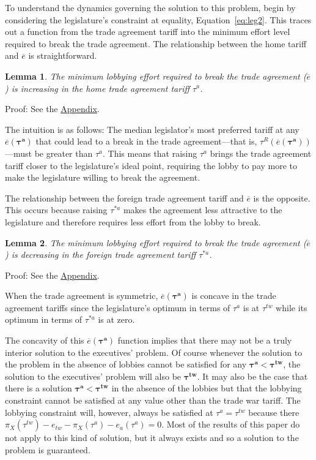 \documentclass[authoryear, review]{elsarticle}
\newtheorem{lemma}{Lemma}
\newcommand{\ov}{\overline}
\newcommand{\bta}{\bm{\tau^a}}
\newcommand{\btw}{\bm{\tau^{tw}}}
\begin{document}
To understand the dynamics governing the solution to this problem, begin by considering the legislature's constraint at equality, Equation~\ref{eq:leg2}. This traces out a function from the trade agreement tariff into the minimum effort level required to break the trade agreement. The relationship between the home tariff and $\ov{e}$ is straightforward. 
\begin{lemma}
  The minimum lobbying effort required to break the trade agreement ($\ov{e}$) is increasing in the home trade agreement tariff $\tau^a$.
  \label{lem:et}
\end{lemma}
Proof: See the \hyperlink{Cor_et}{Appendix}.

\noindent The intuition is as follows: The median legislator's most preferred tariff at any $\ov{e}(\bta)$ that could lead to a break in the trade agreement---that is, $\tau^R\left(\ov{e}(\bta)\right)$---must be greater than $\tau^a$. This means that raising $\tau^a$ brings the trade agreement tariff closer to the legislature's ideal point, requiring the lobby to pay more to make the legislature willing to break the agreement.

The relationship between the foreign trade agreement tariff and $\ov{e}$ is the opposite. This occurs because raising $\tau^{*a}$ makes the agreement less attractive to the legislature and therefore requires less effort from the lobby to break.
\begin{lemma}
  The minimum lobbying effort required to break the trade agreement ($\ov{e}$) is decreasing in the foreign trade agreement tariff $\tau^{*a}$.
  \label{lem:ets}
\end{lemma}
Proof: See the \hyperlink{Lem_ets}{Appendix}.

When the trade agreement is symmetric, $\ov{e}(\bta)$ is concave in the trade agreement tariffs since the legislature's optimum in terms of $\tau^a$ is at $\tau^{tw}$ while its optimum in terms of $\tau^{*a}$ is at zero.

The concavity of this $\ov{e}(\bta)$ function implies that there may not be a truly interior solution to the executives' problem. Of course whenever the solution to the problem in the absence of lobbies cannot be satisfied for any $\bta < \btw$, the solution to the executives' problem will also be $\btw$. It may also be the case that there is a solution $\bta < \btw$ in the absence of the lobbies but that the lobbying constraint cannot be satisfied at any value other than the trade war tariff. The lobbying constraint will, however, always be satisfied at $\tau^a = \tau^{tw}$ because there $\pi_X(\tau^{tw}) -e_{tw} - \pi_X(\tau^a) - e_a(\tau^a) =0$. Most of the results of this paper do not apply to this kind of solution, but it always exists and so a solution to the problem is guaranteed.
\end{document}
